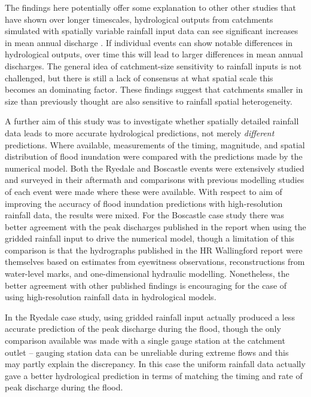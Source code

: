 The findings here potentially offer some explanation to other other studies that have shown over longer timescales, hydrological outputs from catchments simulated with spatially variable rainfall input data can see significant increases in mean annual discharge \citep{coulthard2016sensitivity}. If individual events can show notable differences in hydrological outputs, over time this will lead to larger differences in mean annual discharges. The general idea of catchment-size sensitivity to rainfall inputs is not challenged, but there is still a lack of consensus at what spatial scale this becomes an dominating factor. These findings suggest that catchments smaller in size than previously thought are also sensitive to rainfall spatial heterogeneity.

A further aim of this study was to investigate whether spatially detailed rainfall data leads to more accurate hydrological predictions, not merely \textit{different} predictions. Where available, measurements of the timing, magnitude, and spatial distribution of flood inundation were compared with the predictions made by the numerical model. Both the Ryedale and Boscastle events were extensively studied and surveyed in their aftermath and comparisons with previous modelling studies of each event were made where these were available. With respect to aim of improving the accuracy of flood inundation predictions with high-resolution rainfall data, the results were mixed. For the Boscastle case study there was better agreement with the peak discharges published in the \citep{wallingford2005flooding} report when using the gridded rainfall input to drive the numerical model, though a limitation of this comparison is that the hydrographs published in the HR Wallingford report were themselves based on estimates from eyewitness observations, reconstructions from water-level marks, and one-dimensional hydraulic modelling. Nonetheless, the better agreement with other published findings is encouraging for the case of using high-resolution rainfall data in hydrological models.

In the Ryedale case study, using gridded rainfall input actually produced a less accurate prediction of the peak discharge during the flood, though the only comparison available was made with a single gauge station at the catchment outlet -- gauging station data can be unreliable during extreme flows and this may partly explain the discrepancy. In this case the uniform rainfall data actually gave a better hydrological prediction in terms of matching the timing and rate of peak discharge during the flood. 

